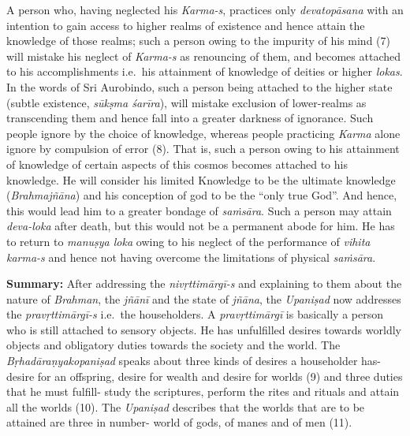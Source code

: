 A person who, having neglected his \emph{Karma-s}, practices only \emph{devato\-pā\-sana} with an intention to gain access to higher realms of existence and hence attain the knowledge of those realms; such a person owing to the impurity of his mind (7) will mistake his neglect of \emph{Karma-s} as renouncing of them, and becomes attached to his accomplishments i.e.\ his attainment of knowledge of deities or higher \emph{lokas}. In the words of Sri Aurobindo, such a person being attached to the higher state (subtle existence, \emph{sūkṣma śarīra}), will mistake exclusion of lower-realms as transcending them and hence fall into a greater darkness of ignorance. Such people ignore by the choice of knowledge, whereas people practicing \emph{Karma} alone ignore by compulsion of error (8). That is, such a person owing to his attainment of knowledge of certain aspects of this cosmos becomes attached to his knowledge. He will consider his limited Knowledge to be the ultimate knowledge (\emph{Brahmajñāna}) and his conception of god to be the ``only true God''. And hence, this would lead him to a greater bondage of \emph{saṁsāra}. Such a person may attain \emph{deva-loka} after death, but this would not be a permanent abode for him. He has to return to \emph{manuṣya loka} owing to his neglect of the performance of \emph{vihita karma-s} and hence not having overcome the limitations of physical \emph{saṁsāra}.

\textbf{Summary:} After addressing the \emph{nivṛttimārgī-s} and explaining to them about the nature of \emph{Brahman}, the \emph{jñānī} and the state of \emph{jñāna}, the \emph{Upaniṣad} now addresses the \emph{pravṛttimārgī-s} i.e.\ the householders. A \emph{pravṛttimārgī} is basically a person who is still attached to sensory objects. He has unfulfilled desires towards worldly objects and obligatory duties towards the society and the world. The \emph{Bṛhadāraṇyakopaniṣad} speaks about three kinds of desires a householder has- desire for an offspring, desire for wealth and desire for worlds (9) and three duties that he must fulfill- study the scriptures, perform the rites and rituals and attain all the worlds (10). The \emph{Upaniṣad} describes that the worlds that are to be attained are three in number- world of gods, of manes and of men (11).

